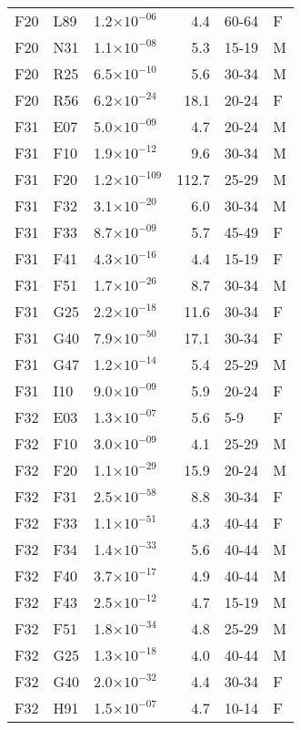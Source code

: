 \begin{longtable}{lllrll}
   F20 & L89 & 1.2$\times10^{-06}$ & 4.4 & 60-64 & F \\ 
   F20 & N31 & 1.1$\times10^{-08}$ & 5.3 & 15-19 & M \\ 
   F20 & R25 & 6.5$\times10^{-10}$ & 5.6 & 30-34 & M \\ 
   F20 & R56 & 6.2$\times10^{-24}$ & 18.1 & 20-24 & F \\ 
   F31 & E07 & 5.0$\times10^{-09}$ & 4.7 & 20-24 & M \\ 
   F31 & F10 & 1.9$\times10^{-12}$ & 9.6 & 30-34 & M \\ 
   F31 & F20 & 1.2$\times10^{-109}$ & 112.7 & 25-29 & M \\ 
   F31 & F32 & 3.1$\times10^{-20}$ & 6.0 & 30-34 & M \\ 
   F31 & F33 & 8.7$\times10^{-09}$ & 5.7 & 45-49 & F \\ 
   F31 & F41 & 4.3$\times10^{-16}$ & 4.4 & 15-19 & F \\ 
   F31 & F51 & 1.7$\times10^{-26}$ & 8.7 & 30-34 & M \\ 
   F31 & G25 & 2.2$\times10^{-18}$ & 11.6 & 30-34 & F \\ 
   F31 & G40 & 7.9$\times10^{-50}$ & 17.1 & 30-34 & F \\ 
   F31 & G47 & 1.2$\times10^{-14}$ & 5.4 & 25-29 & M \\ 
   F31 & I10 & 9.0$\times10^{-09}$ & 5.9 & 20-24 & F \\ 
   F32 & E03 & 1.3$\times10^{-07}$ & 5.6 & 5-9 & F \\ 
   F32 & F10 & 3.0$\times10^{-09}$ & 4.1 & 25-29 & M \\ 
   F32 & F20 & 1.1$\times10^{-29}$ & 15.9 & 20-24 & M \\ 
   F32 & F31 & 2.5$\times10^{-58}$ & 8.8 & 30-34 & F \\ 
   F32 & F33 & 1.1$\times10^{-51}$ & 4.3 & 40-44 & F \\ 
   F32 & F34 & 1.4$\times10^{-33}$ & 5.6 & 40-44 & M \\ 
   F32 & F40 & 3.7$\times10^{-17}$ & 4.9 & 40-44 & M \\ 
   F32 & F43 & 2.5$\times10^{-12}$ & 4.7 & 15-19 & M \\ 
   F32 & F51 & 1.8$\times10^{-34}$ & 4.8 & 25-29 & M \\ 
   F32 & G25 & 1.3$\times10^{-18}$ & 4.0 & 40-44 & M \\ 
   F32 & G40 & 2.0$\times10^{-32}$ & 4.4 & 30-34 & F \\ 
   F32 & H91 & 1.5$\times10^{-07}$ & 4.7 & 10-14 & F \\ 

\end{longtable}
